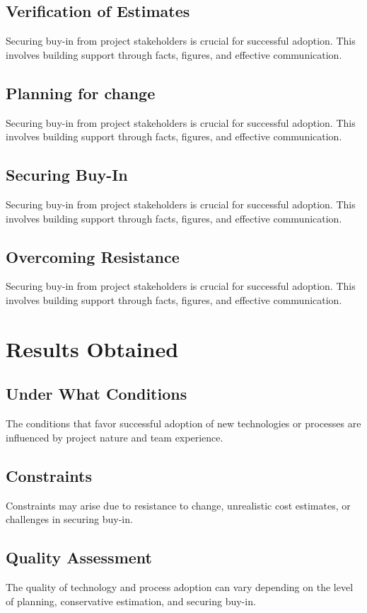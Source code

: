 \documentclass{article}
\begin{document}
\subsection{Verification of Estimates}
Securing buy-in from project stakeholders is crucial for successful adoption. This involves building support through facts, figures, and effective communication.
\subsection{Planning for change}
Securing buy-in from project stakeholders is crucial for successful adoption. This involves building support through facts, figures, and effective communication.
\subsection{Securing Buy-In}
Securing buy-in from project stakeholders is crucial for successful adoption. This involves building support through facts, figures, and effective communication.
\subsection{Overcoming Resistance}
Securing buy-in from project stakeholders is crucial for successful adoption. This involves building support through facts, figures, and effective communication.



\section{Results Obtained}
\subsection{Under What Conditions}
The conditions that favor successful adoption of new technologies or processes are influenced by project nature and team experience.
\subsection{Constraints}
Constraints may arise due to resistance to change, unrealistic cost estimates, or challenges in securing buy-in.
\subsection{Quality Assessment}
The quality of technology and process adoption can vary depending on the level of planning, conservative estimation, and securing buy-in.
\end{document}
